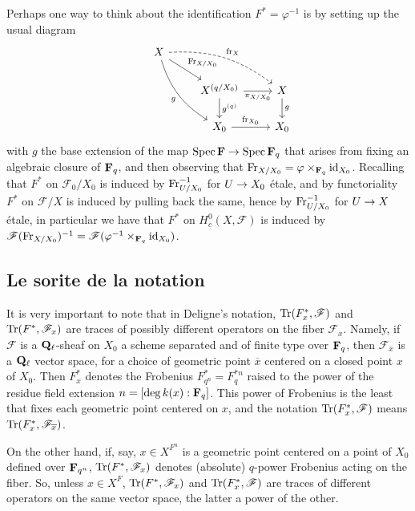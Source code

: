 \documentclass[deligne.tex]{subfiles}
\begin{document}
\remark Perhaps one way to think about the identification
$F^\ast=\varphi^{-1}$ is by setting up the usual diagram
\begin{equation*}
\begin{tikzcd}
&X\arrow[dr,"\Fr_{X/X_0}"]\arrow[drr, dashed,"\fr_X",bend left=20]\arrow[ddr,"g"',bend right=20] \\
&&X^{(q/X_0)}\arrow[r,"\pi_{X/X_0}"']\arrow[d,"g^{(q)}"] &X\arrow[d,"g"] \\
&&X_0\arrow[r,"\fr_{X_0}"] &X_0
\end{tikzcd}
\end{equation*}
with $g$ the base extension of the map $\operatorname{Spec}\mathbf{F}\rightarrow\operatorname{Spec}\mathbf{F}_q$ that
arises from fixing an algebraic closure of $\mathbf{F}_q$, and
then observing that $\operatorname{Fr}_{X/X_0}=\varphi\times_{\mathbf{F}_q}\operatorname{id}_{X_0}$.
Recalling that $F^\ast$ on $\mathscr F_0/X_0$ is induced by 
$\operatorname{Fr}_{U/X_0}^{-1}$ for $U\rightarrow X_0$ étale, and by functoriality
$F^\ast$ on $\mathscr F/X$ is induced by pulling back the same, hence by
$\operatorname{Fr}_{U/X_0}^{-1}$ for $U\rightarrow X$ étale, in particular we have that
$F^\ast$ on $H^0_c(X,\mathscr F)$ is induced by
$\mathscr F(\operatorname{Fr}_{X/X_0})^{-1}=\mathscr F(\varphi^{-1}\times_{\mathbf{F}_q}\operatorname{id}_{X_0})$.

\setcounter{section}{3}\setcounter{subsection}{0}
\subsection{Le sorite de la notation}
It is very important to note that in Deligne's notation,
$\operatorname{Tr}(F^\ast_x,\mathscr F)$ and $\operatorname{Tr}(F^\ast,\mathscr F_x)$ are traces of
possibly different operators on the fiber $\mathscr F_x$.
Namely, if $\mathscr F$ is a $\mathbf{Q}_\ell$-sheaf on $X_0$ a scheme separated and
of finite type over $\mathbf{F}_q$, then $\mathscr F_{\overline x}$ is a
$\mathbf{Q}_\ell$ vector space, for a choice of geometric point $\overline x$ centered
on a closed point $x$ of $X_0$. Then $F^\ast_x$ denotes the 
Frobenius $F^\ast_{q^n}=F^{\ast n}_q$
raised to the power of the residue field extension $n=[\deg k(x) : \mathbf{F}_q]$.
This power of Frobenius is the least that fixes each geometric point centered 
on $x$, and the notation $\operatorname{Tr}(F^\ast_x,\mathscr F)$ means
$\operatorname{Tr}(F^\ast_x,\mathscr F_{\overline x})$.

On the other hand, if, say, $x\in X^{F^n}$ is a geometric point centered on a
point of $X_0$ defined over $\mathbf{F}_{q^n}$, $\operatorname{Tr}(F^\ast, \mathscr F_x)$ denotes
(absolute) $q$-power Frobenius acting on the fiber. So, unless $x\in X^F$,
$\operatorname{Tr}(F^\ast,\mathscr F_x)$ and $\operatorname{Tr}(F^\ast_x,\mathscr F)$ are traces of
different operators on the same vector space, the latter a power of the other.
\end{document}
